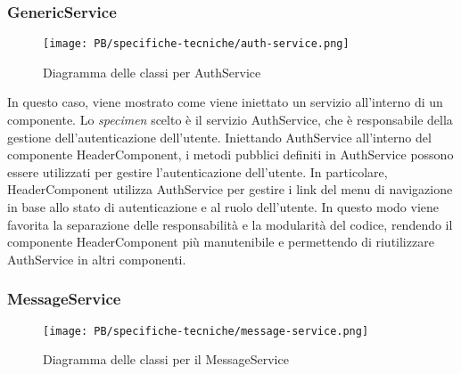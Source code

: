 \subsubsection{GenericService}

\begin{figure}[H]
	\centering
	\texttt{[image: PB/specifiche-tecniche/auth-service.png]}
	\caption{Diagramma delle classi per AuthService}
\end{figure}

In questo caso, viene mostrato come viene iniettato un servizio all'interno di
un componente. Lo \textit{specimen} scelto è il servizio AuthService,
che è responsabile della gestione dell'autenticazione dell'utente. Iniettando
AuthService all'interno del componente HeaderComponent, i metodi pubblici
definiti in AuthService possono essere utilizzati per gestire l'autenticazione
dell'utente. In particolare, HeaderComponent utilizza AuthService per gestire i
link del menu di navigazione in base allo stato di autenticazione e al ruolo 
dell'utente. In questo modo viene favorita la separazione delle responsabilità
e la modularità del codice, rendendo il componente HeaderComponent più
manutenibile e permettendo di riutilizzare AuthService in altri componenti.

\subsubsection{MessageService}

\begin{figure}[H]
	\centering
	\texttt{[image: PB/specifiche-tecniche/message-service.png]}
	\caption{Diagramma delle classi per il MessageService}
\end{figure}

